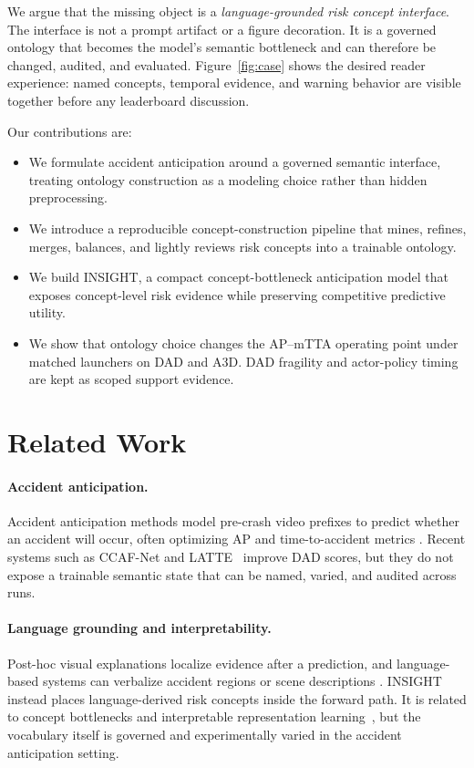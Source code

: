 \documentclass[11pt]{article}
\newcommand{\method}{\textsc{INSIGHT}}
\begin{document}
We argue that the missing object is a \emph{language-grounded risk concept
interface}. The interface is not a prompt artifact or a figure decoration. It
is a governed ontology that becomes the model's semantic bottleneck and can
therefore be changed, audited, and evaluated. Figure~\ref{fig:case} shows the
desired reader experience: named concepts, temporal evidence, and warning
behavior are visible together before any leaderboard discussion.

Our contributions are:
\begin{itemize}
  \item We formulate accident anticipation around a governed semantic interface,
  treating ontology construction as a modeling choice rather than hidden
  preprocessing.
  \item We introduce a reproducible concept-construction pipeline that mines,
  refines, merges, balances, and lightly reviews risk concepts into a trainable
  ontology.
  \item We build \method{}, a compact concept-bottleneck anticipation model
  that exposes concept-level risk evidence while preserving competitive
  predictive utility.
  \item We show that ontology choice changes the AP--mTTA operating point under
  matched launchers on DAD and A3D. DAD fragility and actor-policy timing are
  kept as scoped support evidence.
\end{itemize}

\section{Related Work}

\paragraph{Accident anticipation.}
Accident anticipation methods model pre-crash video prefixes to predict whether
an accident will occur, often optimizing AP and time-to-accident metrics
\citep{ref4,ref17,liao2024crash}. Recent systems such as CCAF-Net
\citep{liu2025ccaf} and LATTE~\citep{ZHANG2025103173} improve DAD scores, but
they do not expose a trainable semantic state that can be named, varied, and
audited across runs.

\paragraph{Language grounding and interpretability.}
Post-hoc visual explanations localize evidence after a prediction, and
language-based systems can verbalize accident regions or scene descriptions
\citep{ref2,liao2024and}. \method{} instead places language-derived risk
concepts inside the forward path. It is related to concept bottlenecks and
interpretable representation learning~\citep{tishby2000information}, but the
vocabulary itself is governed and experimentally varied in the accident
anticipation setting.
\end{document}
